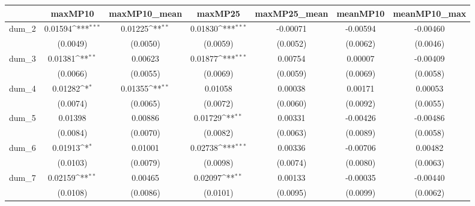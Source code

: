 {
\def\sym#1{\ifmmode^{#1}\else\(^{#1}\)\fi}
\begin{tabular}{l*{6}{c}}
\toprule
            &\multicolumn{1}{c}{maxMP10}&\multicolumn{1}{c}{maxMP10\_mean}&\multicolumn{1}{c}{maxMP25}&\multicolumn{1}{c}{maxMP25\_mean}&\multicolumn{1}{c}{meanMP10}&\multicolumn{1}{c}{meanMP10\_max}\\
\midrule
dum\_2       &     0.01594\sym{***}&     0.01225\sym{**} &     0.01830\sym{***}&    -0.00071         &    -0.00594         &    -0.00460         \\
            &    (0.0049)         &    (0.0050)         &    (0.0059)         &    (0.0052)         &    (0.0062)         &    (0.0046)         \\
dum\_3       &     0.01381\sym{**} &     0.00623         &     0.01877\sym{***}&     0.00754         &     0.00007         &    -0.00409         \\
            &    (0.0066)         &    (0.0055)         &    (0.0069)         &    (0.0059)         &    (0.0069)         &    (0.0058)         \\
dum\_4       &     0.01282\sym{*}  &     0.01355\sym{**} &     0.01058         &     0.00038         &     0.00171         &     0.00053         \\
            &    (0.0074)         &    (0.0065)         &    (0.0072)         &    (0.0060)         &    (0.0092)         &    (0.0055)         \\
dum\_5       &     0.01398         &     0.00886         &     0.01729\sym{**} &     0.00331         &    -0.00426         &    -0.00486         \\
            &    (0.0084)         &    (0.0070)         &    (0.0082)         &    (0.0063)         &    (0.0089)         &    (0.0058)         \\
dum\_6       &     0.01913\sym{*}  &     0.01001         &     0.02738\sym{***}&     0.00336         &    -0.00706         &     0.00482         \\
            &    (0.0103)         &    (0.0079)         &    (0.0098)         &    (0.0074)         &    (0.0080)         &    (0.0063)         \\
dum\_7       &     0.02159\sym{**} &     0.00465         &     0.02097\sym{**} &     0.00133         &    -0.00035         &    -0.00440         \\
            &    (0.0108)         &    (0.0086)         &    (0.0101)         &    (0.0095)         &    (0.0099)         &    (0.0062)         \\

\end{tabular}}
